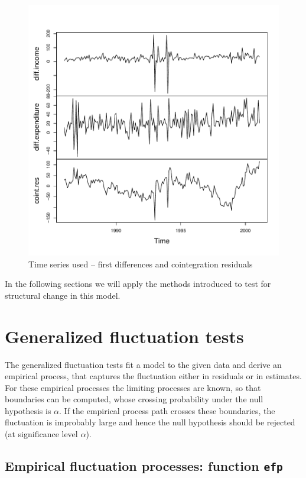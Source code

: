\documentclass[10pt,a4paper]{article}
\begin{document}
\begin{figure}[htbp]
\begin{center}
\includegraphics{strucchange-intro-ts-used}
\caption{\label{fig:ts} Time series used -- first differences and
cointegration residuals} \end{center}
\end{figure}


In the following sections we will apply the methods introduced to test for
structural change in this model.


\section{Generalized fluctuation tests} \label{sec:fluctests}

The generalized fluctuation tests fit a model to the given data and derive an
empirical process, that captures the fluctuation either in residuals or in
estimates. For these empirical processes the limiting processes are known, so
that boundaries can be computed, whose
crossing probability under the null hypothesis is $\alpha$. If the empirical
process path crosses these boundaries, the fluctuation is improbably large and
hence the null hypothesis should be rejected (at significance level $\alpha$).

\subsection{Empirical fluctuation processes: function \texttt{efp}}
\end{document}

